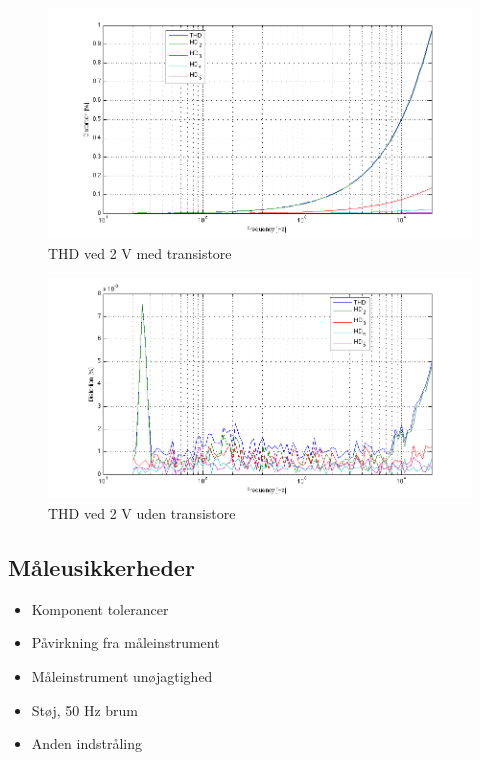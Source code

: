 \begin{figure}[h]
\centering
\includegraphics[width=\textwidth]{maalerapporter/indgangsvaelger/maalinger/opa/mic 2v opa muxudgang thd.png}
\caption{THD ved 2 V med transistore}
\label{fig:apind:2vm}
\end{figure}


\begin{figure}[h]
\centering
\includegraphics[width=\textwidth]{maalerapporter/indgangsvaelger/maalinger/opa/mic 2v opa muxudgang uden transistor thd.png}
\caption{THD ved 2 V uden transistore}
\label{fig:apind:2vu}
\end{figure}

\subsection*{Måleusikkerheder}
\begin{itemize}
\item Komponent tolerancer
\item Påvirkning fra måleinstrument
\item Måleinstrument unøjagtighed
\item Støj, 50 Hz brum
\item Anden indstråling
\end{itemize}
%